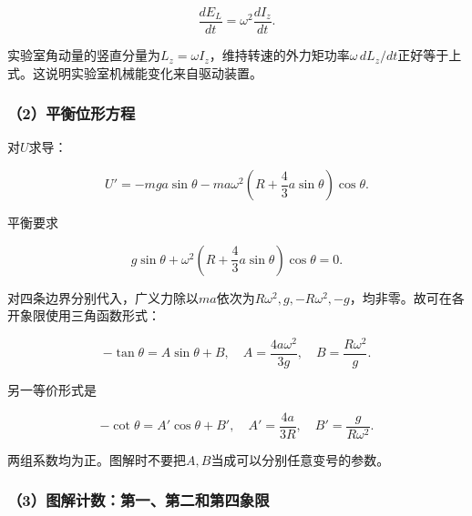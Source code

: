 \documentclass[12pt,a4paper,fontset=fandol]{ctexart}
\begin{document}
\[
\frac{dE_L}{dt}=\omega^2\frac{dI_z}{dt}.
\]

实验室角动量的竖直分量为\(L_z=\omega I_z\)，维持转速的外力矩功率\(\omega\,dL_z/dt\)正好等于上式。这说明实验室机械能变化来自驱动装置。

\subsubsection{（2）平衡位形方程}\label{ux5e73ux8861ux4f4dux5f62ux65b9ux7a0b}

对\(U\)求导：

\[
U'=-mga\sin\theta
-ma\omega^2\left(R+\frac43a\sin\theta\right)\cos\theta.
\]

平衡要求

\[
\boxed{
g\sin\theta+\omega^2
\left(R+\frac43a\sin\theta\right)\cos\theta=0}.
\]

对四条边界分别代入，广义力除以\(ma\)依次为\(R\omega^2,g,-R\omega^2,-g\)，均非零。故可在各开象限使用三角函数形式：

\[
-\tan\theta=A\sin\theta+B,\quad
A=\frac{4a\omega^2}{3g},\quad B=\frac{R\omega^2}{g}.
\]

另一等价形式是

\[
-\cot\theta=A'\cos\theta+B',\quad
A'=\frac{4a}{3R},\quad B'=\frac{g}{R\omega^2}.
\]

两组系数均为正。图解时不要把\(A,B\)当成可以分别任意变号的参数。

\subsubsection{（3）图解计数：第一、第二和第四象限}\label{ux56feux89e3ux8ba1ux6570ux7b2cux4e00ux7b2cux4e8cux548cux7b2cux56dbux8c61ux9650}

\begin{center}
\begin{minipage}{\linewidth}
\centering\begingroup{}
\ifdim\wd\diagrambox>.88\linewidth
\sbox{\diagrambox}{\resizebox{.88\linewidth}{!}{\usebox{\diagrambox}}}\fi
\ifdim\ht\diagrambox>.38\textheight
\resizebox{!}{.38\textheight}{\usebox{\diagrambox}}
\else\usebox{\diagrambox}\fi
\par{}\endgroup\end{minipage}\end{center}
\end{document}
